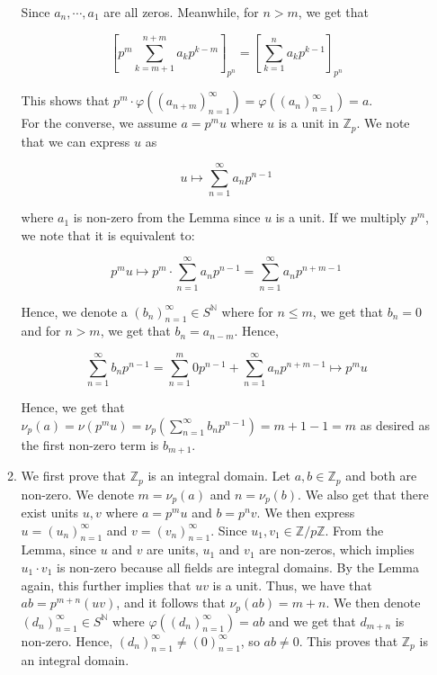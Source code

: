 \documentclass{article}
\begin{document}
\begin{enumerate}
\begin{enumerate}
    Since $a_n, \cdots, a_1$ are all zeros. Meanwhile, for $n > m$, we get that 

    $$[p^m \sum^{n+m}_{k = m+1}a_kp^{k-m}]_{p^n} = [\sum^{n}_{k = 1}a_kp^{k-1}]_{p^n}$$

    This shows that $p^m \cdot \varphi((a_{n+m})^{\infty}_{n=1}) = \varphi((a_n)^{\infty}_{n=1}) = a$.\\

    For the converse, we assume $a = p^mu$ where $u$ is a unit in $\mathbb{Z}_p$. We note that we can express $u$ as

    $$u \mapsto \sum^{\infty}_{n=1}a_n p^{n-1}$$

    where $a_1$ is non-zero from the Lemma since $u$ is a unit. If we multiply $p^m$, we note that it is equivalent to: 

    $$p^mu \mapsto p^m \cdot \sum^{\infty}_{n=1}a_n p^{n-1} = \sum^{\infty}_{n=1}a_n p^{n + m-1} $$

    Hence, we denote a $(b_n)^{\infty}_{n=1} \in S^\mathbb{N}$ where for $n \leq m$, we get that $b_n = 0$ and for $n > m$, we get that $b_n = a_{n - m}$. Hence, 

    $$\sum^{\infty}_{n = 1}b_np^{n-1} = \sum^{m}_{n = 1}0p^{n-1} + \sum^{\infty}_{n=1}a_n p^{n + m-1} \mapsto p^mu$$

    Hence, we get that $\nu_p(a) = \nu(p^mu) = \nu_p(\sum^{\infty}_{n = 1}b_np^{n-1}) = m+1 - 1 = m$ as desired as the first non-zero term is $b_{m+1}$. 
    \\ 
    \item 
    We first prove that $\mathbb{Z}_p$ is an integral domain. Let $a, b \in \mathbb{Z}_p$ and both are non-zero. We denote $m = \nu_p(a)$ and $n = \nu_p(b)$. We also get that there exist units $u, v$ where $a = p^mu$ and $b = p^nv$. We then express $u = (u_n)_{n=1}^{\infty}$ and $v = (v_n)_{n=1}^{\infty}$. Since $u_1, v_1 \in \mathbb{Z}/p\mathbb{Z}$. From the Lemma, since $u$ and $v$ are units, $u_1$ and $v_1$ are non-zeros, which implies $u_1 \cdot v_1$ is non-zero because all fields are integral domains. By the Lemma again, this further implies that $uv$ is a unit. Thus, we have that $ab = p^{m+n}(uv)$, and it follows that $\nu_p(ab) = m + n$. We then denote $(d_n)_{n=1}^{\infty} \in S^{\mathbb{N}}$ where $\varphi((d_n)_{n=1}^{\infty}) = ab$ and we get that $d_{m+n}$ is non-zero. Hence, $(d_n)_{n=1}^{\infty} \neq (0)_{n=1}^{\infty}$, so $ab \neq 0$. This proves that $\mathbb{Z}_p$ is an integral domain.\\


\end{enumerate}
\end{enumerate}
\end{document}
